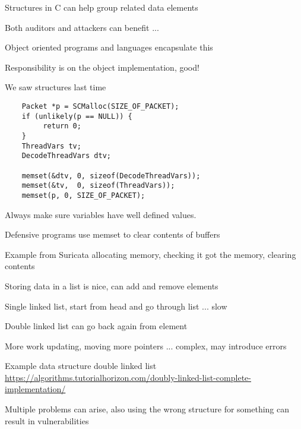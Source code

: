 \documentclass[Screen16to9,17pt]{foils}
\begin{document}


\begin{list2}
\item Structures in C can help group related data elements
\item Both auditors and attackers can benefit ...
\item Object oriented programs and languages encapsulate this
\item Responsibility is on the object implementation, good!
\item We saw structures last time
\end{list2}




\begin{verbatim}
    Packet *p = SCMalloc(SIZE_OF_PACKET);
    if (unlikely(p == NULL)) {
         return 0;
    }
    ThreadVars tv;
    DecodeThreadVars dtv;

    memset(&dtv, 0, sizeof(DecodeThreadVars));
    memset(&tv,  0, sizeof(ThreadVars));
    memset(p, 0, SIZE_OF_PACKET);
\end{verbatim}

\begin{list2}
\item Always make sure variables have well defined values.
\item Defensive programs use memset to clear contents of buffers
\item Example from Suricata allocating memory, checking it got the memory, clearing contents
\end{list2}





\begin{list2}
\item Storing data in a list is nice, can add and remove elements
\item Single linked list, start from head and go through list ... slow
\item Double linked list can go back again from element
\item More work updating, moving more pointers ... complex, may introduce errors
\item Example data structure double linked list\\
\url{https://algorithms.tutorialhorizon.com/doubly-linked-list-complete-implementation/}
\item Multiple problems can arise, also using the wrong structure for something can result in vulnerabilities
\end{list2}
\end{document}
